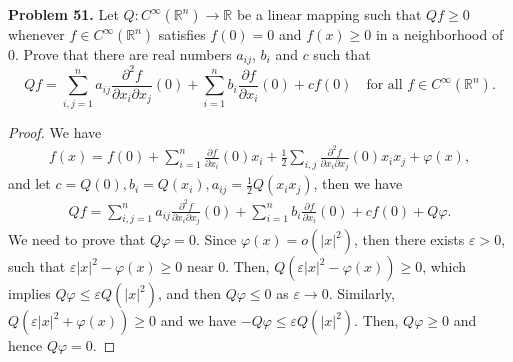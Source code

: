 \documentclass[12pt,leqno]{amsart}
\theoremstyle{definition}
\begin{document}
\noindent
{\bf Problem 51.}
Let $Q:C^\infty(\mathbb{R}^n)\to\mathbb{R}$ be a linear mapping such that $Qf\geq 0$ whenever $f\in C^\infty(\mathbb{R}^n)$ satisfies $f(0)=0$ and $f(x)\geq 0$ in a neighborhood of $0$. Prove that there are real numbers $a_{ij}$, $b_i$ and $c$ such that
$$
Qf=\sum_{i,j=1}^n a_{ij}\frac{\partial^2 f}{\partial x_i\partial x_j}(0)+\sum_{i=1}^n b_i\frac{\partial f}{\partial x_i}(0)+cf(0)
\quad
\text{for all $f\in C^\infty(\mathbb{R}^n)$.}
$$
\begin{proof}
We have 
\begin{align*}
    f(x) = f(0) + \sum^n_{i=1} \frac{\partial f}{\partial x_i}(0) x_i + \frac{1}{2} \sum_{i,j} \frac{\partial^2 f}{\partial x_i \partial x_j}(0) x_i x_j + \varphi(x),
\end{align*}
and let $c = Q(0), b_i = Q(x_i), a_{ij} = \frac{1}{2}Q(x_i x_j)$, then we have 
\begin{align*}
    Qf = \sum_{i,j=1}^n a_{ij}\frac{\partial^2 f}{\partial x_i\partial x_j}(0) + \sum_{i=1}^n b_i\frac{\partial f}{\partial x_i}(0) + cf(0) + Q\varphi.
\end{align*}
We need to prove that $Q\varphi = 0$. Since $\varphi(x) = o(|x|^2)$, then there exists $\varepsilon > 0$, such that $\varepsilon |x|^2 - \varphi(x) \geq 0$ near $0$. Then, $Q \left(\varepsilon |x|^2 - \varphi(x) \right) \geq 0$, which implies $Q\varphi \leq \varepsilon Q\left(|x|^2\right)$, and then $Q\varphi \leq 0$ as $\varepsilon \to 0$. Similarly, $Q \left(\varepsilon |x|^2 + \varphi(x) \right) \geq 0$ and we have $-Q\varphi \leq \varepsilon Q \left(|x|^2\right)$. Then, $Q\varphi \geq 0$ and hence $Q\varphi = 0$.
\end{proof}

\medskip
\end{document}
